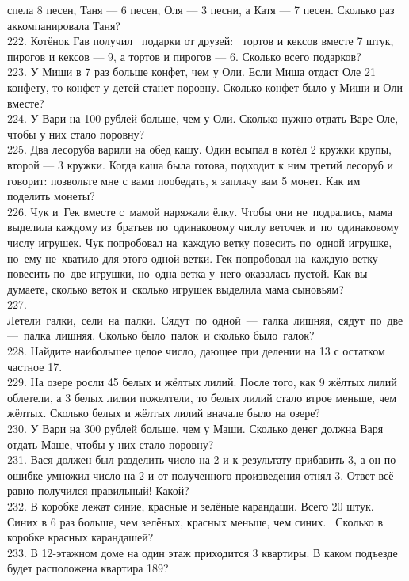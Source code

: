 \documentclass[12pt]{article}
\begin{document}
спела 8 песен, Таня --- 6 песен, Оля --- 3 песни, а Катя --- 7 песен. Сколько раз аккомпанировала Таня?\\
222. Котёнок Гав получил  подарки от друзей:  тортов и кексов вместе 7 штук, пирогов и кексов --- 9, а тортов и пирогов --- 6. Сколько всего подарков?\\
223. У Миши в 7 раз больше конфет, чем у Оли. Если Миша отдаст Оле 21 конфету, то конфет у детей станет поровну. Сколько конфет было у Миши и Оли вместе?\\
224. У Вари на 100 рублей больше, чем у Оли. Сколько нужно отдать Варе Оле, чтобы у них стало поровну?\\
225. Два лесоруба варили на обед кашу. Один всыпал в котёл 2 кружки крупы, второй --- 3 кружки. Когда каша была готова, подходит к ним третий лесоруб и говорит: позвольте мне с вами пообедать, я заплачу вам 5 монет. Как им поделить монеты?\\
226. Чук и Гек вместе с мамой наряжали ёлку. Чтобы они не подрались, мама выделила каждому из братьев по одинаковому числу веточек и по одинаковому числу игрушек. Чук попробовал на каждую ветку повесить по одной игрушке, но ему не хватило для этого одной ветки. Гек попробовал на каждую ветку повесить по две игрушки, но одна ветка у него оказалась пустой. Как вы думаете, сколько веток и сколько игрушек выделила мама сыновьям?\\
227. Летели галки, сели на палки. Сядут по одной --- галка лишняя, сядут по две --- палка лишняя. Сколько было палок и сколько было галок?\\
228. Найдите наибольшее целое число, дающее при делении на 13 с остатком частное 17.\\
229. На озере росли 45 белых и жёлтых лилий. После того, как 9 жёлтых лилий облетели, а 3 белых лилии пожелтели, то белых лилий стало втрое меньше, чем жёлтых. Сколько белых и жёлтых лилий вначале было на озере?\\
230. У Вари на 300 рублей больше, чем у Маши. Сколько денег должна Варя отдать Маше, чтобы у них стало поровну?\\
231. Вася должен был разделить число на 2 и к результату прибавить 3, а он по ошибке умножил число на 2 и от полученного произведения отнял 3. Ответ всё равно получился правильный! Какой?\\
232. В коробке лежат синие, красные и зелёные карандаши. Всего 20 штук. Синих в 6 раз больше, чем зелёных, красных меньше, чем синих. 
Сколько в коробке красных карандашей?\\
233. В 12-этажном доме на один этаж  приходится 3 квартиры. В каком подъезде будет расположена квартира 189?\\
\end{document}
